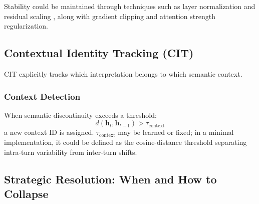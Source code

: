 \documentclass[11pt,a4paper]{article}
\begin{document}
Stability could be maintained through techniques such as layer normalization \cite{ba2016layer} and residual scaling \cite{bachlechner2020rezero}, along with gradient clipping and attention strength regularization.

\subsection{Contextual Identity Tracking (CIT)}

CIT explicitly tracks which interpretation belongs to which semantic context.

\subsubsection{Context Detection}
When semantic discontinuity exceeds a threshold:
\begin{equation}
d(\mathbf{h}_t, \mathbf{h}_{t-1}) > \tau_{\text{context}}
\end{equation}
a new context ID is assigned.
$\tau_{\text{context}}$ may be learned or fixed; in a minimal implementation, it could be defined as the cosine-distance threshold separating intra-turn variability from inter-turn shifts.

\subsection{Strategic Resolution: When and How to Collapse}
\end{document}
